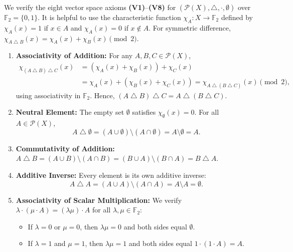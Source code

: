 \begin{exercisesolution}
\label{sol:power_set_f2_vector_space}
We verify the eight vector space axioms \textbf{(V1)}--\textbf{(V8)} for $(\mathcal{P}(X), \bigtriangleup, \cdot, \emptyset)$ over $\mathbb{F}_2 = \{0, 1\}$. It is helpful to use the characteristic function $\chi_A \colon X \to \mathbb{F}_2$ defined by $\chi_A(x) = 1$ if $x \in A$ and $\chi_A(x) = 0$ if $x \notin A$. For symmetric difference, $\chi_{A \mathbin{\triangle} B}(x) = \chi_A(x) + \chi_B(x) \pmod 2$.

\begin{enumerate}[label=(\textbf{V}\arabic*), leftmargin=3.5em]
    \item \textbf{Associativity of Addition:}
    For any $A, B, C \in \mathcal{P}(X)$,
    \begin{align*}
    \chi_{(A \mathbin{\triangle} B) \mathbin{\triangle} C}(x) &= (\chi_A(x) + \chi_B(x)) + \chi_C(x) \\
    &= \chi_A(x) + (\chi_B(x) + \chi_C(x)) = \chi_{A \mathbin{\triangle} (B \mathbin{\triangle} C)}(x) \pmod 2,
    \end{align*}
    using associativity in $\mathbb{F}_2$. Hence, $(A \mathbin{\triangle} B) \mathbin{\triangle} C = A \mathbin{\triangle} (B \mathbin{\triangle} C)$.

    \item \textbf{Neutral Element:}
    The empty set $\emptyset$ satisfies $\chi_\emptyset(x) = 0$. For all $A \in \mathcal{P}(X)$,
    \[
    A \mathbin{\triangle} \emptyset = (A \cup \emptyset) \setminus (A \cap \emptyset) = A \setminus \emptyset = A.
    \]

    \item \textbf{Commutativity of Addition:}
    $A \mathbin{\triangle} B = (A \cup B) \setminus (A \cap B) = (B \cup A) \setminus (B \cap A) = B \mathbin{\triangle} A$.

    \item \textbf{Additive Inverse:}
    Every element is its own additive inverse:
    \[
    A \mathbin{\triangle} A = (A \cup A) \setminus (A \cap A) = A \setminus A = \emptyset.
    \]

    \item \textbf{Associativity of Scalar Multiplication:}
    We verify $\lambda \cdot (\mu \cdot A) = (\lambda \mu) \cdot A$ for all $\lambda, \mu \in \mathbb{F}_2$:
    \begin{itemize}
        \item If $\lambda = 0$ or $\mu = 0$, then $\lambda \mu = 0$ and both sides equal $\emptyset$.
        \item If $\lambda = 1$ and $\mu = 1$, then $\lambda \mu = 1$ and both sides equal $1 \cdot (1 \cdot A) = A$.
    \end{itemize}


\end{enumerate}
\end{exercisesolution}
